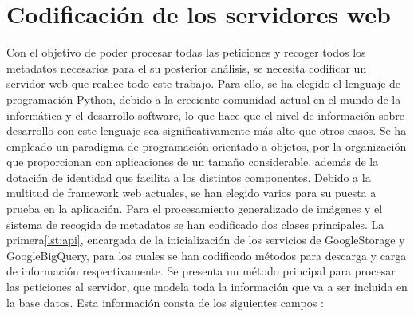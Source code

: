 \section{Codificación de los servidores web}\label{sec:codificación-de-los-servidores-web}
Con el objetivo de poder procesar todas las peticiones y recoger todos los metadatos necesarios para el su posterior análisis, se necesita codificar un servidor web que realice todo este trabajo.
Para ello, se ha elegido el lenguaje de programación Python, debido a la creciente comunidad actual en el mundo de la informática y el desarrollo software, lo que hace que el nivel de información sobre desarrollo con este lenguaje sea significativamente más alto que otros casos.
Se ha empleado un paradigma de programación orientado a objetos, por la organización que proporcionan con aplicaciones de un tamaño considerable, además de la dotación de identidad que facilita a los distintos componentes.
Debido a la multitud de framework web actuales, se han elegido varios para su puesta a prueba en la aplicación.
Para el procesamiento generalizado de imágenes y el sistema de recogida de metadatos se han codificado dos clases principales.
La primera\ref{lst:api}, encargada de la inicialización de los servicios de GoogleStorage y GoogleBigQuery, para los cuales se han codificado métodos para descarga y carga de información respectivamente.
Se presenta un método principal para procesar las peticiones al servidor, que modela toda la información que va a ser incluida en la base datos.
Esta información consta de los siguientes campos :


